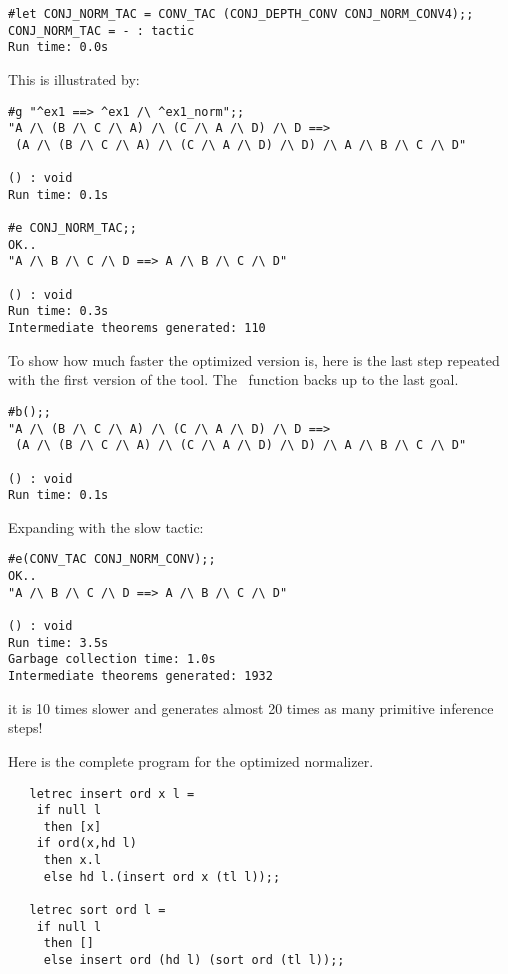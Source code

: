 \begin{session}\begin{verbatim}
#let CONJ_NORM_TAC = CONV_TAC (CONJ_DEPTH_CONV CONJ_NORM_CONV4);;
CONJ_NORM_TAC = - : tactic
Run time: 0.0s
\end{verbatim}\end{session}

\noindent This is illustrated by:

\begin{session}\begin{verbatim}
#g "^ex1 ==> ^ex1 /\ ^ex1_norm";;
"A /\ (B /\ C /\ A) /\ (C /\ A /\ D) /\ D ==>
 (A /\ (B /\ C /\ A) /\ (C /\ A /\ D) /\ D) /\ A /\ B /\ C /\ D"

() : void
Run time: 0.1s

#e CONJ_NORM_TAC;;
OK..
"A /\ B /\ C /\ D ==> A /\ B /\ C /\ D"

() : void
Run time: 0.3s
Intermediate theorems generated: 110
\end{verbatim}\end{session}

\noindent To show how much faster the optimized version is, here is
the last step repeated with the first version of the tool. The \ML\
function  backs up to the last goal.

\begin{session}\begin{verbatim}
#b();;
"A /\ (B /\ C /\ A) /\ (C /\ A /\ D) /\ D ==>
 (A /\ (B /\ C /\ A) /\ (C /\ A /\ D) /\ D) /\ A /\ B /\ C /\ D"

() : void
Run time: 0.1s
\end{verbatim}\end{session}

\noindent Expanding with the slow tactic:

\begin{session}\begin{verbatim}
#e(CONV_TAC CONJ_NORM_CONV);;
OK..
"A /\ B /\ C /\ D ==> A /\ B /\ C /\ D"

() : void
Run time: 3.5s
Garbage collection time: 1.0s
Intermediate theorems generated: 1932
\end{verbatim}\end{session}

\noindent it is 10 times slower and generates almost 20 times as many
primitive inference steps!


Here is the complete \ML{} program for the optimized normalizer.

\begin{hol}\begin{verbatim}
   letrec insert ord x l =
    if null l 
     then [x]
    if ord(x,hd l)
     then x.l
     else hd l.(insert ord x (tl l));;

   letrec sort ord l =
    if null l
     then []
     else insert ord (hd l) (sort ord (tl l));;
\end{verbatim}\end{hol}

